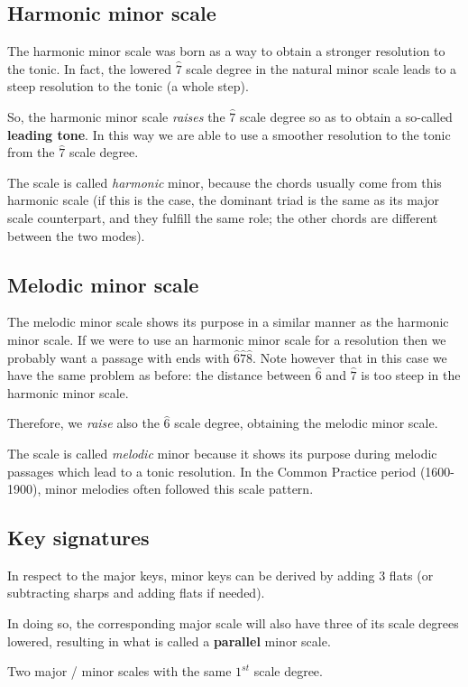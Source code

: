 \subsection{Harmonic minor scale}
The harmonic minor scale was born as a way to obtain a stronger resolution to the tonic. In fact, the lowered $\hat 7$ scale degree in the natural minor scale leads to a steep resolution to the tonic (a whole step).

So, the harmonic minor scale \emph{raises} the $\hat 7$ scale degree so as to obtain a so-called \textbf{leading tone}. In this way we are able to use a smoother resolution to the tonic from the $\hat 7$ scale degree.

The scale is called \emph{harmonic} minor, because the chords usually come from this harmonic scale (if this is the case, the dominant triad is the same as its major scale counterpart, and they fulfill the same role; the other chords are different between the two modes).

\subsection{Melodic minor scale}
The melodic minor scale shows its purpose in a similar manner as the harmonic minor scale. If we were to use an harmonic minor scale for a resolution then we probably want a passage with ends with $\hat 6 \hat 7 \hat 8$. Note however that in this case we have the same problem as before: the distance between $\hat 6$ and $\hat 7$ is too steep in the harmonic minor scale.

Therefore, we \emph{raise} also the $\hat 6$ scale degree, obtaining the melodic minor scale.

The scale is called \emph{melodic} minor because it shows its purpose during melodic passages which lead to a tonic resolution. In the Common Practice period (1600-1900), minor melodies often followed this scale pattern.

\subsection{Key signatures}
In respect to the major keys, minor keys can be derived by adding 3 flats (or subtracting sharps and adding flats if needed).

In doing so, the corresponding major scale will also have three of its scale degrees lowered, resulting in what is called a \textbf{parallel} minor scale.

\begin{definition}
    Two major / minor scales with the same $1^{st}$ scale degree.
\end{definition}

